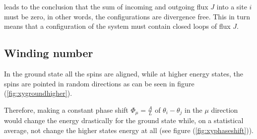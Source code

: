 leads to the conclusion that the sum of incoming and outgoing flux $J$ into a site $i$ must be zero, in other words, the configurations are divergence free. This in turn means that a configuration of the system must contain closed loops of flux $J$.


\subsection{Winding number}
\label{subsec:XYWindingNum}

In the ground state all the spins are aligned, while at higher energy states, the spins are pointed in random directions as can be seen in figure (\ref{fig:xygroundhigher}).



Therefore, making a constant phase shift $\Phi_\mu = \frac{A}{L}$ of $\theta_i - \theta_j$ in the $\mu$ direction would change the energy drastically for the ground state while, on a statistical average, not change the higher states energy at all (see figure (\ref{fig:xyphaseshift})).



